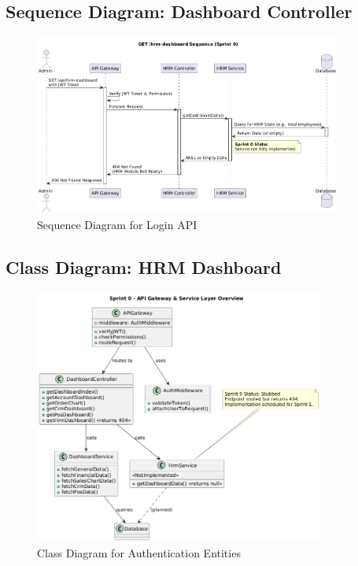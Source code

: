 \subsection{Sequence Diagram: Dashboard Controller}
\begin{figure}[H]
    \centering
    \includegraphics[width=0.9\textwidth]{chapters/chapter 3/hrmFigures/sequence_DG_hrm.png}
    \caption{Sequence Diagram for Login API}
    \label{fig:sprint0_sequence}
\end{figure}

\subsection{Class Diagram: HRM Dashboard }
\begin{figure}[H]
    \centering
    \includegraphics[width=0.85\textwidth]{chapters/chapter 3/hrmFigures/class_diagram_hrm.png}
    \caption{Class Diagram for Authentication Entities}
    \label{fig:sprint0_class}
\end{figure}

